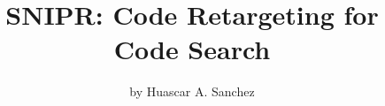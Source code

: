 \documentclass[fontsize=8pt]{memoir} %
\begin{document}
\title{\uppercase{SnipR}: Code Retargeting for Code Search}
\author{by Huascar A. Sanchez}

\date{}
\maketitle








\todos


\end{document}
